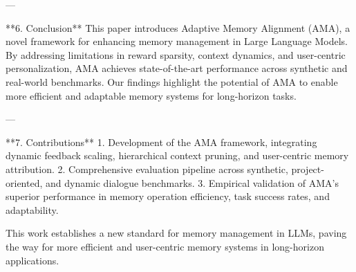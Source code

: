 ---

**6. Conclusion**  
This paper introduces Adaptive Memory Alignment (AMA), a novel framework for enhancing memory management in Large Language Models. By addressing limitations in reward sparsity, context dynamics, and user-centric personalization, AMA achieves state-of-the-art performance across synthetic and real-world benchmarks. Our findings highlight the potential of AMA to enable more efficient and adaptable memory systems for long-horizon tasks.  

---

**7. Contributions**  
1. Development of the AMA framework, integrating dynamic feedback scaling, hierarchical context pruning, and user-centric memory attribution.  
2. Comprehensive evaluation pipeline across synthetic, project-oriented, and dynamic dialogue benchmarks.  
3. Empirical validation of AMA's superior performance in memory operation efficiency, task success rates, and adaptability.  

This work establishes a new standard for memory management in LLMs, paving the way for more efficient and user-centric memory systems in long-horizon applications.